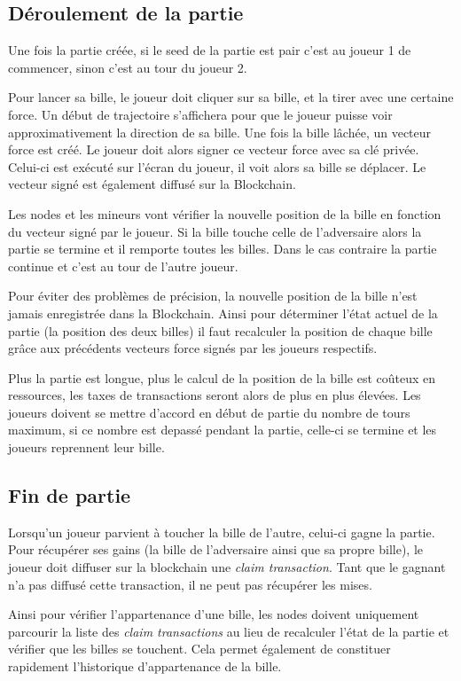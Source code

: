 \documentclass{article}
\begin{document}
\subsection{Déroulement de la partie}
Une fois la partie créée, si le seed de la partie est pair c'est au joueur 1 de commencer, sinon c'est au tour du joueur 2.

Pour lancer sa bille, le joueur doit cliquer sur sa bille, et la tirer avec une certaine force. Un début de trajectoire s'affichera pour que le joueur puisse voir approximativement la direction de sa bille.
Une fois la bille lâchée, un vecteur force est créé. Le joueur doit alors signer ce vecteur force avec sa clé privée. Celui-ci est exécuté sur l'écran du joueur, il voit alors sa bille se déplacer. Le vecteur signé est également diffusé sur la Blockchain.

Les nodes et les mineurs vont vérifier la nouvelle position de la bille en fonction du vecteur signé par le joueur. Si la bille touche celle de l'adversaire alors la partie se termine et il remporte toutes les billes. Dans le cas contraire la partie continue et c'est au tour de l'autre joueur.

Pour éviter des problèmes de précision, la nouvelle position de la bille n'est jamais enregistrée dans la Blockchain. Ainsi pour déterminer l'état actuel de la partie (la position des deux billes) il faut recalculer la position de chaque bille grâce aux précédents vecteurs force signés par les joueurs respectifs.

Plus la partie est longue, plus le calcul de la position de la bille est coûteux en ressources, les taxes de transactions seront alors de plus en plus élevées. Les joueurs doivent se mettre d'accord en début de partie du nombre de tours maximum, si ce nombre est depassé pendant la partie, celle-ci se termine et les joueurs reprennent leur bille.

\subsection{Fin de partie}
Lorsqu'un joueur parvient à toucher la bille de l'autre, celui-ci gagne la partie. Pour récupérer ses gains (la bille de l'adversaire ainsi que sa propre bille), le joueur doit diffuser sur la blockchain une \textit{claim transaction}. Tant que le gagnant n'a pas diffusé cette transaction, il ne peut pas récupérer les mises.

Ainsi pour vérifier l'appartenance d'une bille, les nodes doivent uniquement parcourir la liste des \textit{claim transactions} au lieu de recalculer l'état de la partie et vérifier que les billes se touchent. 
Cela permet également de constituer rapidement l'historique d'appartenance de la bille. 
\end{document}
